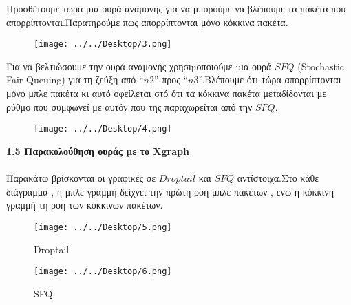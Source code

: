 \documentclass{article}%
\begin{document}
Προσθέτουμε τώρα μια ουρά αναμονής για να μπορούμε να βλέπουμε τα πακέτα που απορρίπτονται.Παρατηρούμε πως απορρίπτονται μόνο κόκκινα πακέτα.


\begin{figure}[htbp]
	\centering
		\texttt{[image: ../../Desktop/3.png]}
	\label{fig:3}
\end{figure}

Για να βελτιώσουμε την ουρά αναμονής χρησιµοποιούμε µια ουρά $SFQ$
\textlatin{(Stochastic Fair Queuing)} για τη ζεύξη από “$n2$” προς “$n3$”.Βλέπουμε ότι τώρα απορρίπτονται μόνο μπλε πακέτα κι αυτό οφείλεται στό ότι τα κόκκινα πακέτα μεταδίδονται με ρύθμο που συμφωνεί με αυτόν που της παραχωρείται από την $SFQ$. 
\begin{figure}[htbp]
	\centering
		\texttt{[image: ../../Desktop/4.png]}
	\label{fig:4}
\end{figure}
\newpage

\textbf{{\underline{1.5 Παρακολούθηση ουράς µε το \textlatin{Xgraph}}}} \\\\
Παρακάτω βρίσκονται οι γραφικές σε $Droptail$ και $SFQ$ αντίστοιχα.Στο κάθε διάγραμμα , η μπλε γραμμή δείχνει την πρώτη ροή μπλε πακέτων , ενώ η κόκκινη γραμμή τη ροή των κόκκινων πακέτων.

\begin{figure}[htbp]
	\centering
		\texttt{[image: ../../Desktop/5.png]}
	\caption{Droptail}
\end{figure}
\begin{figure}[htbp]
	\centering
		\texttt{[image: ../../Desktop/6.png]}
	\caption{SFQ}
\end{figure}

\end{document}
